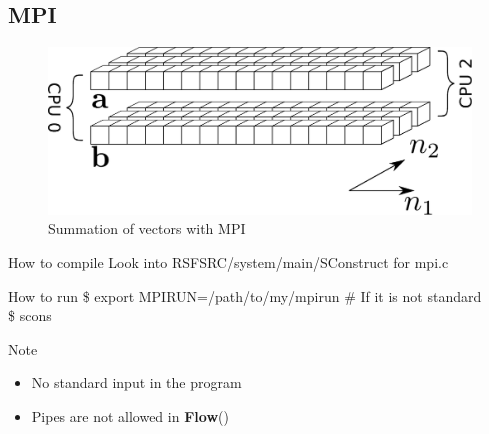 \subsection{MPI}

\begin{frame}
  \begin{figure}
  \includegraphics[scale=0.55]{Fig/abcmpi.pdf}
  \caption{Summation of vectors with MPI}
  \end{figure}
\end{frame}

\begin{frame}
\end{frame}
\begin{frame}
\end{frame}
\begin{frame}
\end{frame}
\begin{frame}
\end{frame}

\begin{frame}
  \begin{block}{How to compile}
    Look into RSFSRC/system/main/SConstruct for mpi.c 
  \end{block}
  \begin{block}{How to run}
    \$ export MPIRUN=/path/to/my/mpirun \# If it is not standard \\
    \$ scons
  \end{block}
  \begin{block}{Note}
    \begin{itemize}
      \item No standard input in the program
      \item Pipes are not allowed in {\bf Flow}()
    \end{itemize}
  \end{block}
\end{frame}

